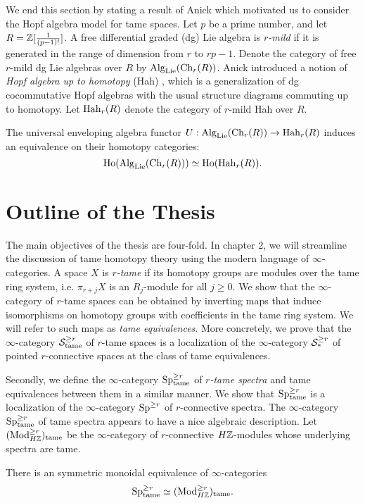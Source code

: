 We end this section by stating a result of Anick \cite{AnickHopf} which motivated us to consider the Hopf algebra model for tame spaces.
Let $p$ be a prime number, and let $R={\mathbb{Z}}[{\frac{1}{(p-1)!}}]$. 
A free differential graded (dg) Lie algebra is \emph{$r$-mild}  if it is generated in the range of dimension from $r$ to $rp-1$. Denote the category of free $r$-mild dg Lie algebras over $R$  by $\operatorname{Alg}_{\operatorname{Lie}}(\operatorname{Ch}_{r}(R))$. Anick introduced a notion of \emph{Hopf algebra up to homotopy} (Hah) \cite[Definition 4.1]{AnickHopf}, which is a generalization of dg cocommutative Hopf algebras with the usual structure diagrams commuting up to homotopy. Let $\operatorname{Hah}_{r}(R)$ denote the category of $r$-mild Hah over $R$.

\begin{theorem}
The universal enveloping algebra functor $U:\operatorname{Alg}_{\operatorname{Lie}}(\operatorname{Ch}_{r}(R))\rightarrow \operatorname{Hah}_{r}(R)$ induces an equivalence on their homotopy categories:
$$
\operatorname{Ho}(\operatorname{Alg}_{\operatorname{Lie}}(\operatorname{Ch}_{r}(R)) )\simeq \operatorname{Ho}(\operatorname{Hah}_{r}(R)).
$$
\end{theorem}

\section{Outline of the Thesis}
The main objectives of the thesis are four-fold.
In chapter 2, we will streamline the discussion of tame homotopy theory using the modern language of $\infty$-categories.
A space $X$ is \emph{$r$-tame} if its homotopy groups are modules over the tame ring system, i.e.
$\pi_{r+j}X$ is an $R_j$-module for all $j\geq 0$.
We show that the $\infty$-category of $r$-tame spaces can be obtained by inverting maps that induce isomorphisms on homotopy groups with coefficients in the tame ring system. We will refer to such maps as \emph{tame equivalences}.
More concretely, we prove that the $\infty$-category ${\mathcal{S}}^{\geq r}_{\operatorname{\operatorname{tame}}}$ of $r$-tame spaces is a localization of the $\infty$-category ${\mathcal{S}}^{\geq r}_*$ of pointed $r$-connective spaces at the class of tame equivalences.

Secondly, we define the $\infty$-category $\operatorname{Sp}^{\geq r}_{\operatorname{\operatorname{tame}}}$ of \emph{$r$-tame spectra} and tame equivalences between them in a similar manner. We show that $\operatorname{Sp}^{\geq r}_{\operatorname{\operatorname{tame}}}$ is a localization of the $\infty$-category $\operatorname{Sp}^{\geq r}$ of $r$-connective spectra.
The $\infty$-category $\operatorname{Sp}^{\geq r}_{\operatorname{\operatorname{tame}}}$ of tame spectra appears to have a nice algebraic description.
Let $(\operatorname{Mod}_{H{\mathbb{Z}}}^{\geq r})_{\operatorname{\operatorname{tame}}}$ be the $\infty$-category of $r$-connective $H{\mathbb{Z}}$-modules whose underlying spectra are tame.
\begin{thmx}
\label{Theorem A}
There is an symmetric monoidal equivalence of $\infty$-categories
$$
\operatorname{Sp}^{\geq r}_{\operatorname{\operatorname{tame}}} \simeq (\operatorname{Mod}_{H{\mathbb{Z}}}^{\geq r})_{\operatorname{\operatorname{tame}}}.
$$
\end{thmx}

